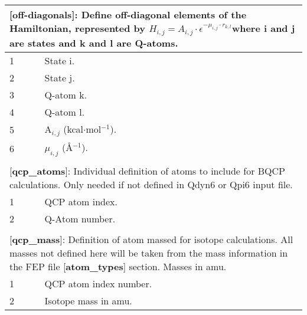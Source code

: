 \documentclass[a4paper,11pt]{article}
\begin{document}
\begin{longtable}{|p{53pt}|p{181pt}|p{160pt}|}
\multicolumn{3}{p{394pt}}{[\textbf{off-diagonals}]: Define off-diagonal elements of the Hamiltonian, represented by $H_{i,j}=A_{i,j}\cdot \epsilon^{-\mu_{i,j}\cdot r_{k,l}}$where i and j are states and k and l are Q-atoms.}\\
\hline 1 & \multicolumn{2}{p{341pt}|}{State i.}\\
\hline 2 & \multicolumn{2}{p{341pt}|}{State j.}\\
\hline 3 & \multicolumn{2}{p{341pt}|}{Q-atom k.}\\
\hline 4 & \multicolumn{2}{p{341pt}|}{Q-atom l.}\\
\hline 5 & \multicolumn{2}{p{341pt}|}{A$_{i,j}$ (kcal$\cdot$mol$^{-1}$).}\\
\hline 6 & \multicolumn{2}{p{341pt}|}{$\mu_{i,j}$ ({\AA}$^{-1}$).}\\
\hline
\multicolumn{3}{p{394pt}}{}\\
\multicolumn{3}{p{394pt}}{[\textbf{qcp{\_}atoms}]: Individual definition of atoms to include for BQCP calculations. Only needed if not defined in Qdyn6 or Qpi6 input file.}\\
\hline 1 & \multicolumn{2}{p{341pt}|}{QCP atom index.}\\
\hline 2 & \multicolumn{2}{p{341pt}|}{Q-Atom number.}\\
\hline
\multicolumn{3}{p{394pt}}{}\\
\multicolumn{3}{p{394pt}}{[\textbf{qcp{\_}mass}]: Definition of atom massed for isotope calculations. All masses not defined here will be taken from the mass information in the FEP file [\textbf{atom{\_}types}] section. Masses in amu.}\\
\hline 1 & \multicolumn{2}{p{341pt}|}{QCP atom index number.}\\
\hline 2 & \multicolumn{2}{p{341pt}|}{Isotope mass in amu.}\\


\hline
\end{longtable}
\normalsize
\end{document}
